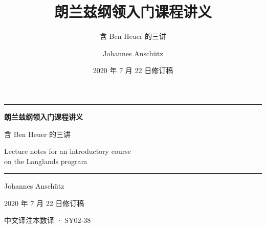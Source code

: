 \documentclass[11pt,lang=cn,math=cm,thmcnt=section,usesamecnt]{elegantbook}
\title{朗兰兹纲领入门课程讲义}
\subtitle{含 Ben Heuer 的三讲}
\author{Johannes Anschütz}
\date{2020 年 7 月 22 日修订稿}
\begin{document}
\begin{titlepage}
\centering
\vspace*{2.2cm}
{\color{structurecolor}\rule{\textwidth}{1.2pt}}\par
\vspace{1.4cm}
{\Huge\bfseries 朗兰兹纲领入门课程讲义\par}
\vspace{0.9cm}
{\Large 含 Ben Heuer 的三讲\par}
\vspace{0.6cm}
{\large\normalfont Lecture notes for an introductory course\\ on the Langlands program\par}
\vspace{1.2cm}
{\color{structurecolor}\rule{\textwidth}{0.6pt}}\par
\vfill
{\large Johannes Anschütz\par}
\vspace{0.4cm}
{\large 2020 年 7 月 22 日修订稿\par}
\vspace{1.6cm}
{\large 中文译注本\quad 数译 · SY02-38\par}
\vspace{0.8cm}
\end{titlepage}
\hypersetup{pageanchor=true}
\frontmatter
\tableofcontents

\mainmatter












\backmatter

\printindex
\end{document}
